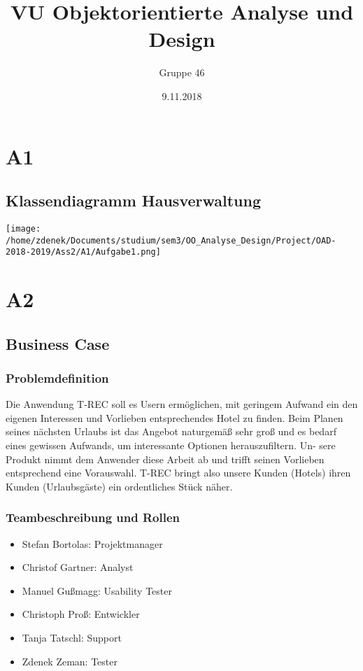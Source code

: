 \documentclass[a4paper]{article}
\begin{document}
  \title{VU Objektorientierte Analyse und Design}
  \author{Gruppe 46}
  \date{9.11.2018}
  \maketitle

\section{A1}
\subsection{Klassendiagramm Hausverwaltung}

\texttt{[image: /home/zdenek/Documents/studium/sem3/OO\_Analyse\_Design/Project/OAD-2018-2019/Ass2/A1/Aufgabe1.png]}


\section{A2}

\subsection{Business Case}

\subsubsection{Problemdefinition}

Die Anwendung T-REC soll es Usern ermöglichen, mit geringem Aufwand ein
den eigenen Interessen und Vorlieben entsprechendes Hotel zu finden. Beim
Planen seines nächsten Urlaubs ist das Angebot naturgemäß sehr groß und es
bedarf eines gewissen Aufwands, um interessante Optionen herauszufiltern. Un-
sere Produkt nimmt dem Anwender diese Arbeit ab und trifft seinen Vorlieben
entsprechend eine Vorauswahl. T-REC bringt also unsere Kunden (Hotels) ihren
Kunden (Urlaubsgäste) ein ordentliches Stück näher.

\subsubsection{Teambeschreibung und Rollen}

\begin{itemize}
\item Stefan Bortolas: Projektmanager
\item Christof Gartner: Analyst
\item Manuel Gußmagg: Usability Tester
\item Christoph Proß: Entwickler
\item Tanja Tatschl: Support
\item Zdenek Zeman: Tester
\end{itemize}
\end{document}
